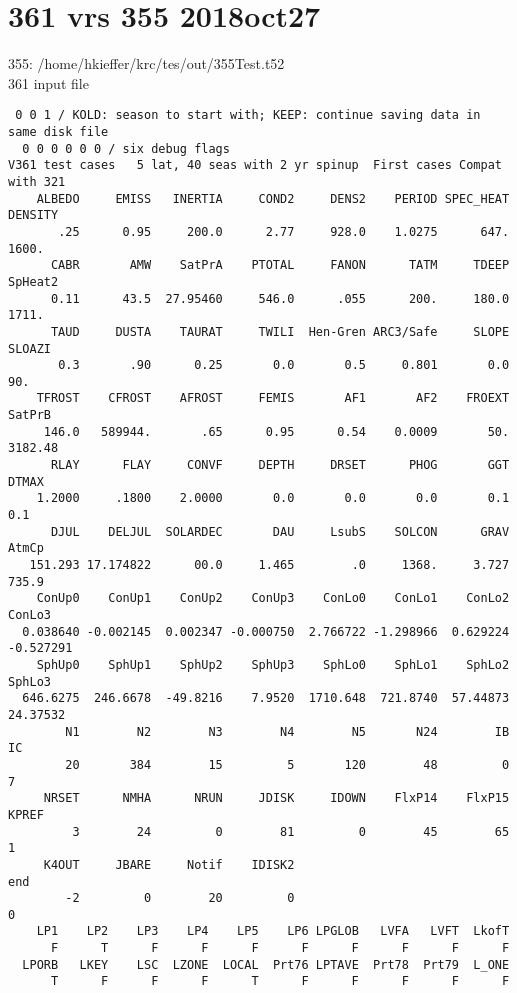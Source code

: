 \documentclass{article}
\begin{document}
\section{361 vrs 355  2018oct27} %
355: /home/hkieffer/krc/tes/out/355Test.t52
\\ 361 input file
\begin{verbatim}
 0 0 1 / KOLD: season to start with; KEEP: continue saving data in same disk file
  0 0 0 0 0 0 / six debug flags
V361 test cases   5 lat, 40 seas with 2 yr spinup  First cases Compat with 321
    ALBEDO     EMISS   INERTIA     COND2     DENS2    PERIOD SPEC_HEAT   DENSITY
       .25      0.95     200.0      2.77     928.0    1.0275      647.     1600.
      CABR       AMW    SatPrA    PTOTAL     FANON      TATM     TDEEP   SpHeat2
      0.11      43.5  27.95460     546.0      .055      200.     180.0     1711.
      TAUD     DUSTA    TAURAT     TWILI  Hen-Gren ARC3/Safe     SLOPE    SLOAZI
       0.3       .90      0.25       0.0       0.5     0.801       0.0       90.
    TFROST    CFROST    AFROST     FEMIS       AF1       AF2    FROEXT    SatPrB
     146.0   589944.       .65      0.95      0.54    0.0009       50.   3182.48
      RLAY      FLAY     CONVF     DEPTH     DRSET      PHOG       GGT     DTMAX
    1.2000     .1800    2.0000       0.0       0.0       0.0       0.1       0.1
      DJUL    DELJUL  SOLARDEC       DAU     LsubS    SOLCON      GRAV     AtmCp
   151.293 17.174822      00.0     1.465        .0     1368.     3.727     735.9
    ConUp0    ConUp1    ConUp2    ConUp3    ConLo0    ConLo1    ConLo2    ConLo3
  0.038640 -0.002145  0.002347 -0.000750  2.766722 -1.298966  0.629224 -0.527291
    SphUp0    SphUp1    SphUp2    SphUp3    SphLo0    SphLo1    SphLo2    SphLo3
  646.6275  246.6678  -49.8216    7.9520  1710.648  721.8740  57.44873  24.37532
        N1        N2        N3        N4        N5       N24        IB        IC
        20       384        15         5       120        48         0         7
     NRSET      NMHA      NRUN     JDISK     IDOWN    FlxP14    FlxP15     KPREF
         3        24         0        81         0        45        65         1
     K4OUT     JBARE     Notif    IDISK2                                     end
        -2         0        20         0                                       0
    LP1    LP2    LP3    LP4    LP5    LP6 LPGLOB   LVFA   LVFT  LkofT
      F      T      F      F      F      F      F      F      F      F
  LPORB   LKEY    LSC  LZONE  LOCAL  Prt76 LPTAVE  Prt78  Prt79  L_ONE
      T      F      F      F      T      F      F      F      F      F

\end{verbatim}
\end{document}
